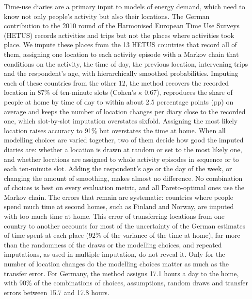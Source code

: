 \documentclass[a4paper]{article}
\begin{document}
Time-use diaries are a primary input to models of energy demand, which need to know not only people's activity but also their locations. The German contribution to the 2010 round of the Harmonised European Time Use Surveys (HETUS) records activities and trips but not the places where activities took place. We impute these places from the 13 HETUS countries that record all of them, assigning one location to each activity episode with a Markov chain that conditions on the activity, the time of day, the previous location, intervening trips and the respondent's age, with hierarchically smoothed probabilities. Imputing each of these countries from the other 12, the method recovers the recorded location in 87\% of ten-minute slots (Cohen's $\kappa$ 0.67), reproduces the share of people at home by time of day to within about 2.5 percentage points (pp) on average and keeps the number of location changes per diary close to the recorded one, which slot-by-slot imputation overstates sixfold. Assigning the most likely location raises accuracy to 91\% but overstates the time at home. When all modelling choices are varied together, two of them decide how good the imputed diaries are: whether a location is drawn at random or set to the most likely one, and whether locations are assigned to whole activity episodes in sequence or to each ten-minute slot. Adding the respondent's age or the day of the week, or changing the amount of smoothing, makes almost no difference. No combination of choices is best on every evaluation metric, and all Pareto-optimal ones use the Markov chain. The errors that remain are systematic: countries where people spend much time at second homes, such as Finland and Norway, are imputed with too much time at home. This error of transferring locations from one country to another accounts for most of the uncertainty of the German estimates of time spent at each place (92\% of the variance of the time at home), far more than the randomness of the draws or the modelling choices, and repeated imputations, as used in multiple imputation, do not reveal it. Only for the number of location changes do the modelling choices matter as much as the transfer error. For Germany, the method assigns 17.1 hours a day to the home, with 90\% of the combinations of choices, assumptions, random draws and transfer errors between 15.7 and 17.8 hours.
\end{document}
